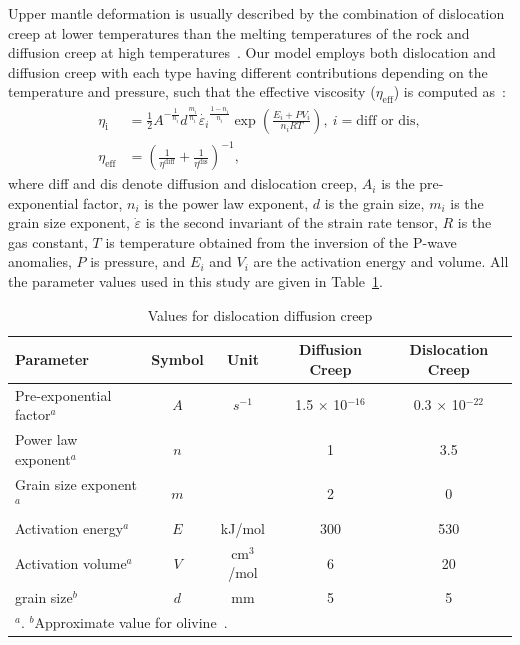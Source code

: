 \documentclass[draft,linenumbers]{agujournal2018}
\begin{document}
Upper mantle deformation is usually described by the combination of dislocation creep at lower temperatures than the melting temperatures of the rock and diffusion creep at high temperatures~\citep[e.g.,][]{gordon1967thermally}. Our model employs both dislocation and diffusion creep with each type having different contributions depending on the temperature and pressure, such that the effective viscosity ($\eta_{\text{eff}}$) is computed as~\citep{billen2007rheologic}:
%
\begin{align}
    \eta_{\text{i}} &= \frac{1}{2} A^{-\frac{1}{n_i}} d^\frac{m_i}{n_i} \dot{\varepsilon_i}^{\frac{1-n_i}{n_i}} \exp\left(\frac{E_i + PV_i}{n_iRT}\right),\ i=\text{diff or dis}, \\
    \eta_{\text{eff}} &= \left(\frac{1}{\eta^\text{diff}} + \frac{1}{\eta^\text{dis}}\right)^{-1},
\end{align}
%
where diff and dis denote diffusion and dislocation creep, $A_i$ is the pre-exponential factor, $n_i$ is the power law exponent, $d$ is the grain size, $m_i$ is the grain size exponent, $\dot{\varepsilon}$ is the second invariant of the strain rate tensor, $R$ is the gas constant, $T$ is temperature obtained from the inversion of the P-wave anomalies, $P$ is pressure, and $E_i$ and $V_i$ are the activation energy and volume. All the parameter values used in this study are given in Table~\ref{table_model}.
%
\begin{table}[ht] \label{table_model}
    \caption{Values for dislocation diffusion creep}
    \centering
    \begin{tabular}{l c c c c}
    \hline
     Parameter  & Symbol & Unit & Diffusion Creep & Dislocation Creep  \\
    \hline
      Pre-exponential factor$^a$ & $A$ & $s^{-1}$ & 1.5 $\times$ 10$^{-16}$ & 0.3 $\times$ 10$^{-22}$   \\
      Power law exponent$^a$ & $n$ & & 1 & 3.5  \\
      Grain size exponent$^a$  & $m$ & & 2 & 0   \\
      Activation energy$^a$  & $E$ & kJ/mol & 300 & 530   \\
      Activation volume$^a$  & $V$ & cm$^3$/mol & 6 & 20 \\
      grain size$^b$         & $d$ & mm & 5 & 5 \\
    \hline
    \multicolumn{5}{l}{$^{a}$\citet{karato1993rheology}. $^b$Approximate value for olivine~\citep{karato1984grain}.}
    \end{tabular}
\end{table}
\end{document}
